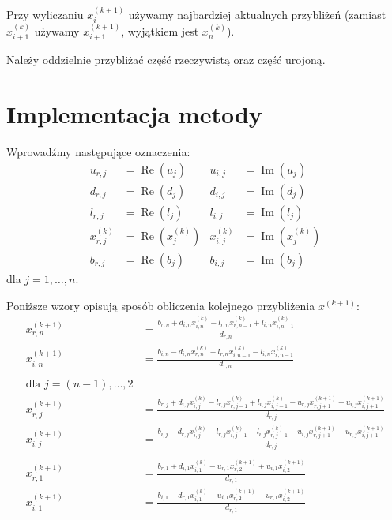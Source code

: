 \documentclass[12pt]{article}
\begin{document}
	Przy wyliczaniu $x^{(k+1)}_i$ używamy najbardziej aktualnych przybliżeń (zamiast $x^{(k)}_{i+1}$ używamy $x^{(k+1)}_{i+1}$, wyjątkiem jest $x^{(k)}_n$).
	
	Należy oddzielnie przybliżać część rzeczywistą oraz część urojoną.
	
	\section{Implementacja metody}
	
	Wprowadźmy następujące oznaczenia:
	\begin{align*}
		u_{r, j}       & = \operatorname{Re}(u_j)       & u_{i, j}       & = \operatorname{Im}(u_j)       \\
		d_{r, j}       & = \operatorname{Re}(d_j)       & d_{i, j}       & = \operatorname{Im}(d_j)       \\
		l_{r, j}       & = \operatorname{Re}(l_j)       & l_{i, j}       & = \operatorname{Im}(l_j)       \\
		x^{(k)}_{r, j} & = \operatorname{Re}(x^{(k)}_j) & x^{(k)}_{i, j} & = \operatorname{Im}(x^{(k)}_j) \\
		b_{r, j}       & = \operatorname{Re}(b_j)       & b_{i, j}       & = \operatorname{Im}(b_j)
	\end{align*}
	dla $j = 1, \dots, n$.
	
	
	Poniższe wzory opisują sposób obliczenia kolejnego przybliżenia $x^{(k+1)}$:
	\begin{align*}
		x^{(k+1)}_{r, n} & = \frac{b_{r, n} + d_{i, n} x^{(k)}_{i, n} - l_{r, n} x^{(k)}_{r, n-1} + l_{i, n} x^{(k)}_{i, n-1}}{ d_{r, n} } \\ 
		x^{(k+1)}_{i, n} & = \frac{b_{i, n} - d_{i, n} x^{(k)}_{r, n} - l_{r, n} x^{(k)}_{i, n-1} - l_{i, n} x^{(k)}_{r, n-1}}{ d_{r, n} } \\
		\\
		\text{dla $j = (n-1), \dots, 2$} \\
		x^{(k+1)}_{r, j} & = \frac{b_{r, j} + d_{i, j} x^{(k)}_{i, j} - l_{r, j} x^{(k)}_{r, j-1} + l_{i, j} x^{(k)}_{i, j-1} - u_{r, j} x^{(k+1)}_{r, j+1} + u_{i, j} x^{(k+1)}_{i, j+1} }{ d_{r, j} } \\ 
		x^{(k+1)}_{i, j} & = \frac{b_{i, j} - d_{r, j} x^{(k)}_{i, j} - l_{r, j} x^{(k)}_{i, j-1} - l_{i, j} x^{(k)}_{r, j-1} - u_{i, j} x^{(k+1)}_{r, j+1} - u_{r, j} x^{(k+1)}_{i, j+1} }{ d_{r, j} } \\
		\\
		x^{(k+1)}_{r, 1} & = \frac{b_{r, 1} + d_{i, 1} x^{(k)}_{i, 1} - u_{r, 1} x^{(k+1)}_{r, 2} + u_{i, 1} x^{(k+1)}_{i, 2} }{ d_{r, 1} } \\ 
		x^{(k+1)}_{i, 1} & = \frac{b_{i, 1} - d_{r, 1} x^{(k)}_{i, 1} - u_{i, 1} x^{(k+1)}_{r, 2} - u_{r, 1} x^{(k+1)}_{i, 2} }{ d_{r, 1} }
	\end{align*}
	
\end{document}
